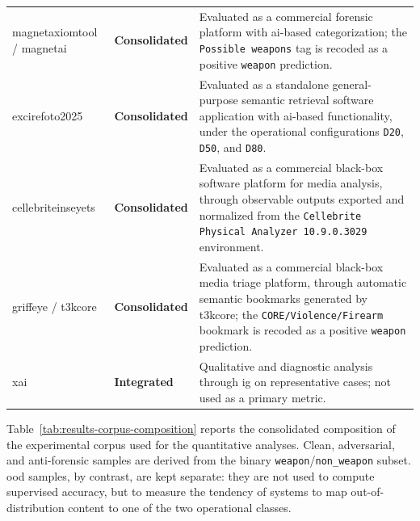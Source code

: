 \begin{table}[H]
\begin{tabularx}{\textwidth}{@{}p{} p{} X@{}}
\gls{magnetaxiomtool} / \gls{magnetai} &
\textbf{Consolidated} &
Evaluated as a commercial forensic platform with \gls{ai}-based
categorization; the \texttt{Possible weapons} tag is recoded as a positive
\texttt{weapon} prediction. \\

\gls{excirefoto2025} &
\textbf{Consolidated} &
Evaluated as a standalone general-purpose semantic retrieval software
application with \gls{ai}-based functionality, under the operational
configurations \texttt{D20}, \texttt{D50}, and \texttt{D80}. \\

\gls{cellebriteinseyets} &
\textbf{Consolidated} &
Evaluated as a commercial black-box software platform for media analysis,
through observable outputs exported and normalized from the
\texttt{Cellebrite Physical Analyzer 10.9.0.3029} environment. \\

\gls{griffeye} / \gls{t3kcore} &
\textbf{Consolidated} &
Evaluated as a commercial black-box media triage platform, through automatic
semantic bookmarks generated by \gls{t3kcore}; the
\texttt{CORE/Violence/Firearm} bookmark is recoded as a positive
\texttt{weapon} prediction. \\

\gls{xai} &
\textbf{Integrated} &
Qualitative and diagnostic analysis through \gls{ig} on representative cases;
not used as a primary metric. \\

\bottomrule
\end{tabularx}
\end{table}

Table~\ref{tab:results-corpus-composition} reports the consolidated composition
of the experimental corpus used for the quantitative analyses. Clean,
adversarial, and anti-forensic samples are derived from the binary
\texttt{weapon}/\texttt{non\_weapon} subset. \gls{ood} samples, by contrast,
are kept separate: they are not used to compute supervised accuracy, but to
measure the tendency of systems to map out-of-distribution content to one of
the two operational classes.

